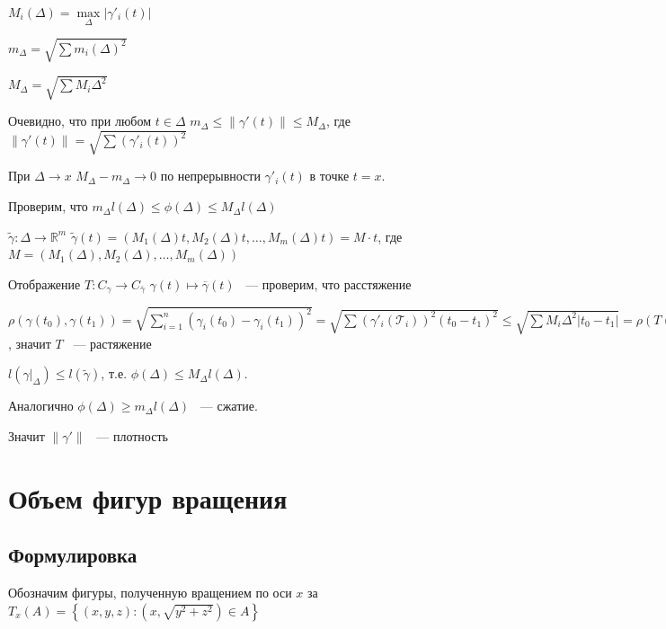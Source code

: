 \documentclass{article}
\begin{document}
            $M_i(\Delta) = \max\limits_{\Delta} |\gamma'_i(t) |$
            
            $m_{\Delta} = \sqrt{\sum m_i(\Delta)^2}$
            
            $M_{\Delta} = \sqrt{\sum M_i{\Delta}^2}$
            
            Очевидно, что при любом $t \in \Delta$ $m_{\Delta} \leq \| \gamma'(t) \|  \leq M_{\Delta}$, где $\| \gamma'(t) \| = \sqrt{\sum(\gamma'_i(t))^2}$
            
            При $\Delta \rightarrow x$ $M_{\Delta} - m_{\Delta} \rightarrow 0$ по непрерывности $\gamma'_i(t)$ в точке $t = x$.
            
            Проверим, что $m_{\Delta} l(\Delta) \leq \phi(\Delta) \leq M_{\Delta} l(\Delta)$
            
            $\widetilde{\gamma} : \Delta \rightarrow \mathbb{R}^m$ $\widetilde{\gamma}(t) = \left(M_1(\Delta)t, M_2(\Delta)t, \ldots, M_m(\Delta)t\right) = M \cdot t$, где $M = (M_1(\Delta), M_2(\Delta), \ldots, M_m(\Delta) )$
            
            Отображение $T : C_{\gamma} \rightarrow C_{\overline{\gamma}}$ $\gamma(t) \mapsto \overline{\gamma}(t)$ ~--- проверим, что расстяжение
            
            $\rho(\gamma(t_0), \gamma(t_1)) = \sqrt{\sum\limits_{i = 1}^n (\gamma_i(t_0) - \gamma_i(t_1))^2} = \sqrt{\sum(\gamma'_i(\mathcal{T}_i))^2(t_0 - t_1)^2} \leq \sqrt{\sum M_i{\Delta}^2 |t_0 - t_1|} = \rho(T(\gamma(t_0)), T(\gamma(t_1)))$, значит $T$ ~--- растяжение
            
            $l\left( \gamma|_{\Delta} \right) \leq l(\widetilde{\gamma})$, т.е. $\phi(\Delta) \leq M_{\Delta} l(\Delta)$.
            
            Аналогично $\phi(\Delta) \geq m_{\Delta}l(\Delta)$ ~--- сжатие.
            
            Значит $\| \gamma' \|$ ~--- плотность
            
    \newpage
    
    \section{Объем фигур вращения}
    
        \subsection{Формулировка}
            Обозначим фигуры, полученную вращением по оси $x$ за $T_x(A) = \left\{ (x, y, z) : (x, \sqrt{y^2 + z^2}) \in A \right\}$
        
\end{document}
